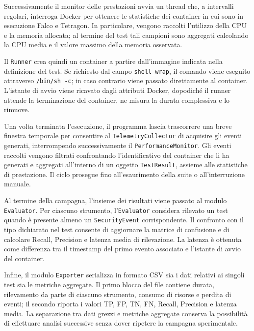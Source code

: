 \documentclass[12pt,a4paper,openright,twoside]{book}
\begin{document}


Successivamente il monitor delle prestazioni avvia un thread che, a intervalli regolari, interroga Docker per ottenere le statistiche dei container in cui sono in esecuzione Falco e Tetragon. In particolare, vengono raccolti l'utilizzo della CPU e la memoria allocata; al termine del test tali campioni sono aggregati calcolando la CPU media e il valore massimo della memoria osservata.

Il \texttt{Runner} crea quindi un container a partire dall'immagine indicata nella definizione del test. Se richiesto dal campo \texttt{shell\_wrap}, il comando viene eseguito attraverso \texttt{/bin/sh -c}; in caso contrario viene passato direttamente al container. L'istante di avvio viene ricavato dagli attributi Docker, dopodiché il runner attende la terminazione del container, ne misura la durata complessiva e lo rimuove.

Una volta terminata l'esecuzione, il programma lascia trascorrere una breve finestra temporale per consentire al \texttt{TelemetryCollector} di acquisire gli eventi generati, interrompendo successivamente il \texttt{PerformanceMonitor}. Gli eventi raccolti vengono filtrati confrontando l'identificativo del container che li ha generati e aggregati all'interno di un oggetto \texttt{TestResult}, assieme alle statistiche di prestazione. Il ciclo prosegue fino all'esaurimento della suite o all'interruzione manuale.

Al termine della campagna, l'insieme dei risultati viene passato al modulo \texttt{Evaluator}. Per ciascuno strumento, l'\texttt{Evaluator} considera rilevato un test quando è presente almeno un \texttt{SecurityEvent} corrispondente. Il confronto con il tipo dichiarato nel test consente di aggiornare la matrice di confusione e di calcolare Recall, Precision e latenza media di rilevazione. La latenza è ottenuta come differenza tra il timestamp del primo evento associato e l'istante di avvio del container.

Infine, il modulo \texttt{Exporter} serializza in formato CSV sia i dati relativi ai singoli test sia le metriche aggregate. Il primo blocco del file contiene durata, rilevamento da parte di ciascuno strumento, consumo di risorse e perdita di eventi; il secondo riporta i valori TP, FP, TN, FN, Recall, Precision e latenza media. La separazione tra dati grezzi e metriche aggregate conserva la possibilità di effettuare analisi successive senza dover ripetere la campagna sperimentale.
\end{document}
